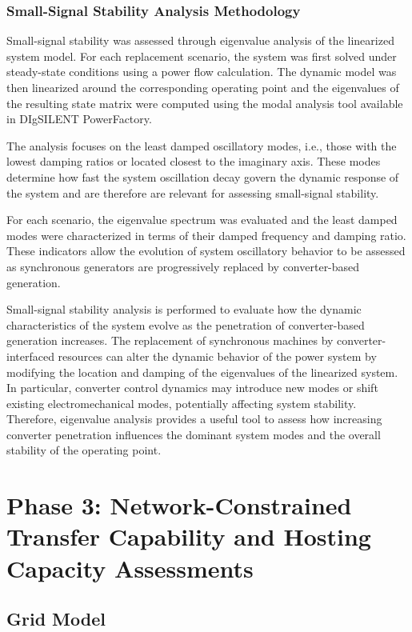 \subsubsection{Small-Signal Stability Analysis Methodology}

Small-signal stability was assessed through eigenvalue analysis of the linearized system model. For each replacement scenario, the system was first solved under steady-state conditions using a power flow calculation. The dynamic model was then linearized around the corresponding operating point and the eigenvalues of the resulting state matrix were computed using the modal analysis tool available in DIgSILENT PowerFactory.

The analysis focuses on the least damped oscillatory modes, i.e., those with the lowest damping ratios or located closest to the imaginary axis. These modes determine how fast the system oscillation decay  govern the dynamic response of the system and are therefore are relevant for assessing small-signal stability.

For each scenario, the eigenvalue spectrum was evaluated and the least damped modes were characterized in terms of their damped frequency and damping ratio. These indicators allow the evolution of system oscillatory behavior to be assessed as synchronous generators are progressively replaced by converter-based generation.

Small-signal stability analysis is performed to evaluate how the dynamic characteristics of the system evolve as the penetration of converter-based generation increases. The replacement of synchronous machines by converter-interfaced resources can alter the dynamic behavior of the power system by modifying the location and damping of the eigenvalues of the linearized system. In particular, converter control dynamics may introduce new modes or shift existing electromechanical modes, potentially affecting system stability. Therefore, eigenvalue analysis provides a useful tool to assess how increasing converter penetration influences the dominant system modes and the overall stability of the operating point.

\section{Phase 3: Network-Constrained Transfer Capability and Hosting Capacity Assessments}

\subsection{Grid Model}

